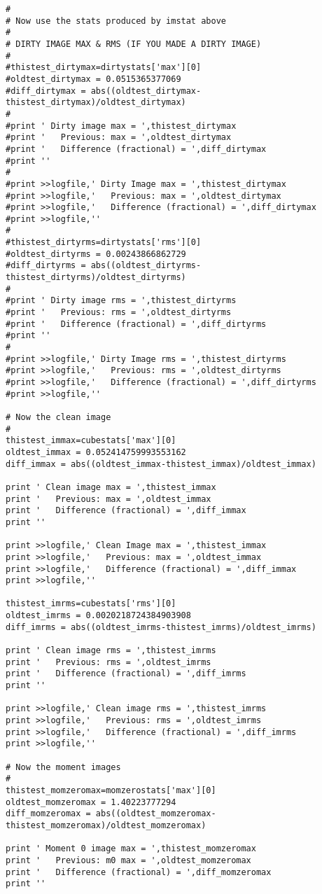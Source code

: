 \begin{verbatim}
#
# Now use the stats produced by imstat above
#
# DIRTY IMAGE MAX & RMS (IF YOU MADE A DIRTY IMAGE)
#
#thistest_dirtymax=dirtystats['max'][0]
#oldtest_dirtymax = 0.0515365377069
#diff_dirtymax = abs((oldtest_dirtymax-thistest_dirtymax)/oldtest_dirtymax)
#
#print ' Dirty image max = ',thistest_dirtymax
#print '   Previous: max = ',oldtest_dirtymax
#print '   Difference (fractional) = ',diff_dirtymax
#print ''
#
#print >>logfile,' Dirty Image max = ',thistest_dirtymax
#print >>logfile,'   Previous: max = ',oldtest_dirtymax
#print >>logfile,'   Difference (fractional) = ',diff_dirtymax
#print >>logfile,''
#
#thistest_dirtyrms=dirtystats['rms'][0]
#oldtest_dirtyrms = 0.00243866862729
#diff_dirtyrms = abs((oldtest_dirtyrms-thistest_dirtyrms)/oldtest_dirtyrms)
#
#print ' Dirty image rms = ',thistest_dirtyrms
#print '   Previous: rms = ',oldtest_dirtyrms
#print '   Difference (fractional) = ',diff_dirtyrms
#print ''
#
#print >>logfile,' Dirty Image rms = ',thistest_dirtyrms
#print >>logfile,'   Previous: rms = ',oldtest_dirtyrms
#print >>logfile,'   Difference (fractional) = ',diff_dirtyrms
#print >>logfile,''

# Now the clean image
#
thistest_immax=cubestats['max'][0]
oldtest_immax = 0.052414759993553162
diff_immax = abs((oldtest_immax-thistest_immax)/oldtest_immax)

print ' Clean image max = ',thistest_immax
print '   Previous: max = ',oldtest_immax
print '   Difference (fractional) = ',diff_immax
print ''

print >>logfile,' Clean Image max = ',thistest_immax
print >>logfile,'   Previous: max = ',oldtest_immax
print >>logfile,'   Difference (fractional) = ',diff_immax
print >>logfile,''

thistest_imrms=cubestats['rms'][0]
oldtest_imrms = 0.0020218724384903908
diff_imrms = abs((oldtest_imrms-thistest_imrms)/oldtest_imrms)

print ' Clean image rms = ',thistest_imrms
print '   Previous: rms = ',oldtest_imrms
print '   Difference (fractional) = ',diff_imrms
print ''

print >>logfile,' Clean image rms = ',thistest_imrms
print >>logfile,'   Previous: rms = ',oldtest_imrms
print >>logfile,'   Difference (fractional) = ',diff_imrms
print >>logfile,''

# Now the moment images
#
thistest_momzeromax=momzerostats['max'][0]
oldtest_momzeromax = 1.40223777294
diff_momzeromax = abs((oldtest_momzeromax-thistest_momzeromax)/oldtest_momzeromax)

print ' Moment 0 image max = ',thistest_momzeromax
print '   Previous: m0 max = ',oldtest_momzeromax
print '   Difference (fractional) = ',diff_momzeromax
print ''


\end{verbatim}

